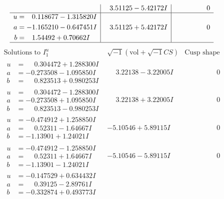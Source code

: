 \documentclass[1p]{elsarticle_modified}
\theoremstyle{definition}
\newcommand{\I}{\sqrt{-1}}
\begin{document}
$$\begin{array}{c|c|c}
 & \phantom{-}3.51125 - 5.42172 I & \phantom{-0.000000 } 0 \\ \hline\begin{aligned}
u &= \phantom{-}0.118677 - 1.315820 I \\
a &= -1.165210 - 0.647451 I \\
b &= \phantom{-}1.54492 + 0.70662 I\end{aligned}
 & \phantom{-}3.51125 + 5.42172 I & \phantom{-0.000000 } 0\\
 \hline 
 \end{array}$$\newpage$$\begin{array}{c|c|c}  
\text{Solutions to }I^u_{1}& \I (\text{vol} + \sqrt{-1}CS) & \text{Cusp shape}\\
 \hline 
\begin{aligned}
u &= \phantom{-}0.304472 + 1.288300 I \\
a &= -0.273508 - 1.095850 I \\
b &= \phantom{-}0.823513 + 0.980253 I\end{aligned}
 & \phantom{-}3.22138 - 3.22005 I & \phantom{-0.000000 } 0 \\ \hline\begin{aligned}
u &= \phantom{-}0.304472 - 1.288300 I \\
a &= -0.273508 + 1.095850 I \\
b &= \phantom{-}0.823513 - 0.980253 I\end{aligned}
 & \phantom{-}3.22138 + 3.22005 I & \phantom{-0.000000 } 0 \\ \hline\begin{aligned}
u &= -0.474912 + 1.258850 I \\
a &= \phantom{-}0.52311 - 1.64667 I \\
b &= -1.13901 + 1.24021 I\end{aligned}
 & -5.10546 + 5.89115 I & \phantom{-0.000000 } 0 \\ \hline\begin{aligned}
u &= -0.474912 - 1.258850 I \\
a &= \phantom{-}0.52311 + 1.64667 I \\
b &= -1.13901 - 1.24021 I\end{aligned}
 & -5.10546 - 5.89115 I & \phantom{-0.000000 } 0 \\ \hline\begin{aligned}
u &= -0.147529 + 0.634432 I \\
a &= \phantom{-}0.39125 - 2.89761 I \\
b &= -0.332874 + 0.493773 I\end{aligned}

\end{array}$$
\end{document}
